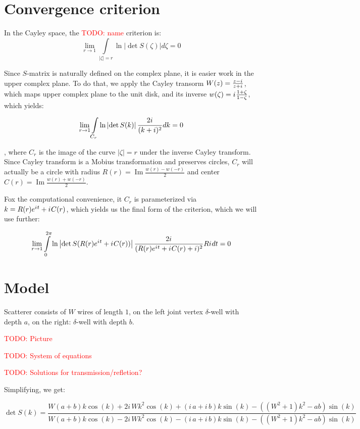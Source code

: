 \documentclass[12pt, a4paper]{article}
\newcommand{\abs}[1]{\left| #1 \right|}
\newcommand{\eexp}[1]{e^{#1}}
\newcommand{\iu}{{i\mkern1mu}}
\renewcommand{\Im}{\operatorname{Im}}
\newcommand{\todo}[1]{{\large \textcolor{red}{TODO: #1}}}
\begin{document}
\section{Convergence criterion}

In the Cayley space, the \todo{name} criterion is:
\[
\lim\limits_{r \to 1} \int\limits_{\abs{\zeta} = r} \ln \abs{\det S(\zeta)} d\zeta = 0
\]

Since $S$-matrix is naturally defined on the complex plane, it is easier work in the upper complex plane. To do that, we apply the Cayley transorm $W(z) = \frac{z - \iu}{z + \iu}$, which maps upper complex plane to the unit disk, and its inverse $w(\zeta) = \iu \frac{1 + \zeta}{1 - \zeta}$, which yields:

\begin{equation}\label{crit}
\lim\limits_{r \to 1} \int\limits_{C_r} \ln \abs{\det S(k)} \frac{2 \iu}{(k + i)^2} dk = 0
\end{equation}

, where $C_r$ is the image of the curve $\abs{\zeta} = r$ under the inverse Cayley transform. Since Cayley transform is a Mobius transformation and preserves circles, $C_r$ will actually be a circle with radius $R(r) = \Im \frac{w(r) - w(-r)}{2}$ and center $C(r) = \Im \frac{w(r) + w(-r)}{2}$.

Fox the computational convenience, it $C_r$ is parameterized via $k = R(r) \eexp{\iu t} + \iu C(r)$, which yields us the final form of the criterion, which we will use further:

\begin{equation}\label{critp}
\lim\limits_{r \to 1} \int\limits_{0}^{2 \pi} \ln \abs{\det S(R(r) \eexp{\iu t} + \iu C(r))} \frac{2 \iu}{(R(r) \eexp{\iu t} + \iu C(r) + i)^2} R \iu dt = 0
\end{equation}

\section{Model}

Scatterer consists of $W$ wires of length $1$, on the left joint vertex $\delta$-well with depth $a$, on the right: $\delta$-well with depth $b$. 

\todo{Picture}

\todo{System of equations}

\todo{Solutions for transmission/refletion?}

Simplifying, we get:

\[
\det S(k) = \frac{W {\left(a + b\right)} k \cos\left(k\right) + 2 i \, W k^{2} \cos\left(k\right) + {\left(i \, a + i \, b\right)} k \sin\left(k\right) - {\left({\left(W^{2} + 1\right)} k^{2} - a b\right)} \sin\left(k\right)}{W {\left(a + b\right)} k \cos\left(k\right) - 2 i \, W k^{2} \cos\left(k\right) - {\left(i \, a + i \, b\right)} k \sin\left(k\right) - {\left({\left(W^{2} + 1\right)} k^{2} - a b\right)} \sin\left(k\right)}
\]
\end{document}
